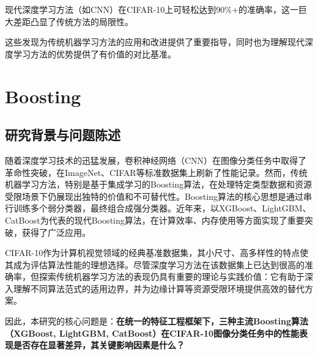 \documentclass[UTF8]{report}
\theoremstyle{MyLineTheoremStyle} %
\theoremstyle{MyBlockTheoremStyle} %
\theoremstyle{MySubsubsectionStyle} %
\begin{document}
现代深度学习方法（如CNN）在CIFAR-10上可轻松达到90\%+的准确率，这一巨大差距凸显了传统方法的局限性。


这些发现为传统机器学习方法的应用和改进提供了重要指导，同时也为理解现代深度学习方法的优势提供了有价值的对比基准。



























\chapter{Boosting}

\section{研究背景与问题陈述}
随着深度学习技术的迅猛发展，卷积神经网络（CNN）在图像分类任务中取得了革命性突破，在ImageNet、CIFAR等标准数据集上刷新了性能记录。然而，传统机器学习方法，特别是基于集成学习的Boosting算法，在处理特定类型数据和资源受限场景下仍展现出独特的价值和不可替代性。Boosting算法的核心思想是通过串行训练多个弱分类器，最终组合成强分类器。近年来，以XGBoost、LightGBM、CatBoost为代表的现代Boosting算法，在计算效率、内存使用等方面实现了重要突破，获得了广泛应用。

CIFAR-10作为计算机视觉领域的经典基准数据集，其小尺寸、高多样性的特点使其成为评估算法性能的理想选择。尽管深度学习方法在该数据集上已达到很高的准确率，但探索传统机器学习方法的表现仍具有重要的理论与实践价值：它有助于深入理解不同算法范式的适用边界，并为边缘计算等资源受限环境提供高效的替代方案。

因此，本研究的核心问题是：\textbf{在统一的特征工程框架下，三种主流Boosting算法（XGBoost, LightGBM, CatBoost）在CIFAR-10图像分类任务中的性能表现是否存在显著差异，其关键影响因素是什么？}
\end{document}
